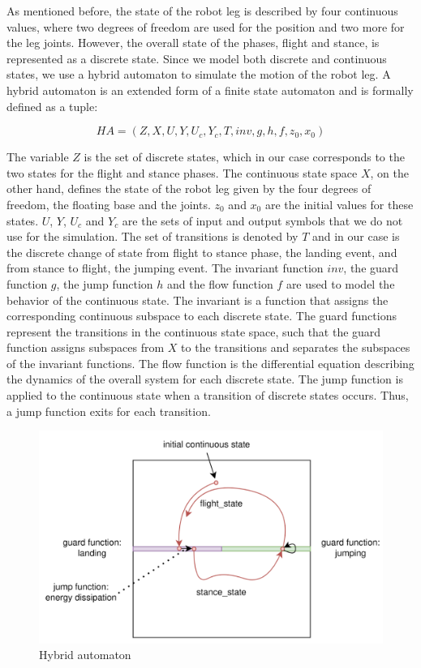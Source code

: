 \documentclass[journal,onecolumn]{IEEEtran}
\begin{document}
	As mentioned before, the state of the robot leg is described by four continuous values, where two degrees of freedom are used for the position and two more for the leg joints. However, the overall state of the phases, flight and stance, is represented as a discrete state. Since we model both discrete and continuous states, we use a hybrid automaton to simulate the motion of the robot leg. A hybrid automaton is an extended form of a finite state automaton and is formally defined as a tuple:
	
	$$ HA = (Z, X, U, Y, U_c, Y_c, T, inv, g, h, f, z_0, x_0) $$ 
	
	The variable $Z$ is the set of discrete states, which in our case corresponds to the two states for the flight and stance phases. The continuous state space $X$, on the other hand, defines the state of the robot leg given by the four degrees of freedom, the floating base and the joints. $z_0$ and $x_0$ are the initial values for these states. $U$, $Y$, $U_c$ and $Y_c$ are the sets of input and output symbols that we do not use for the simulation. The set of transitions is denoted by $T$ and in our case is the discrete change of state from flight to stance phase, the landing event, and  from stance to flight, the jumping event. The invariant function $inv$, the guard function $g$, the jump function $h$ and the flow function $f$ are used to model the behavior of the continuous state. The invariant is a function that assigns the corresponding continuous subspace to each discrete state.  The guard functions represent the transitions in the continuous state space, such that the guard function assigns subspaces from $X$ to the transitions and separates the subspaces of the invariant functions. The flow function is the differential equation describing the dynamics of the overall system for each discrete state. The jump function is applied to the continuous state when a transition of discrete states occurs. Thus, a jump function exits for each transition.
	
	\begin{figure}[h]
		\centering
		\includegraphics[scale=0.17]{"assets/hybrid_automaton.png"}
		\caption{Hybrid automaton}
		\label{fig:hybrid_automaton}
	\end{figure}
	
\end{document}
